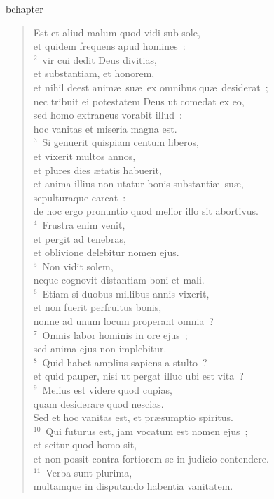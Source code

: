 bchapter\begin{verse}\vspace{-19pt}Est et aliud malum quod vidi sub sole,\\ et quidem frequens apud homines~:\\
${}^{2}$~vir cui dedit Deus divitias,\\ et substantiam, et honorem,\\ et nihil deest anim\ae\ su\ae\ ex omnibus qu\ae\ desiderat~;\\ nec tribuit ei potestatem Deus ut comedat ex eo,\\ sed homo extraneus vorabit illud~:\\ hoc vanitas et miseria magna est.\\
${}^{3}$~Si genuerit quispiam centum liberos,\\ et vixerit multos annos,\\ et plures dies \ae tatis habuerit,\\ et anima illius non utatur bonis substanti\ae\ su\ae ,\\ sepulturaque careat~:\\ de hoc ergo pronuntio quod melior illo sit abortivus.\\
${}^{4}$~Frustra enim venit,\\ et pergit ad tenebras,\\ et oblivione delebitur nomen ejus.\\
${}^{5}$~Non vidit solem,\\ neque cognovit distantiam boni et mali.\\
${}^{6}$~Etiam si duobus millibus annis vixerit,\\ et non fuerit perfruitus bonis,\\ nonne ad unum locum properant omnia~?\\
${}^{7}$~Omnis labor hominis in ore ejus~;\\ sed anima ejus non implebitur.\\
${}^{8}$~Quid habet amplius sapiens a stulto~?\\ et quid pauper, nisi ut pergat illuc ubi est vita~?\\
${}^{9}$~Melius est videre quod cupias,\\ quam desiderare quod nescias.\\ Sed et hoc vanitas est, et pr\ae sumptio spiritus.\\
${}^{10}$~Qui futurus est, jam vocatum est nomen ejus~;\\ et scitur quod homo sit,\\ et non possit contra fortiorem se in judicio contendere.\\
${}^{11}$~Verba sunt plurima,\\ multamque in disputando habentia vanitatem.\end{verse}


